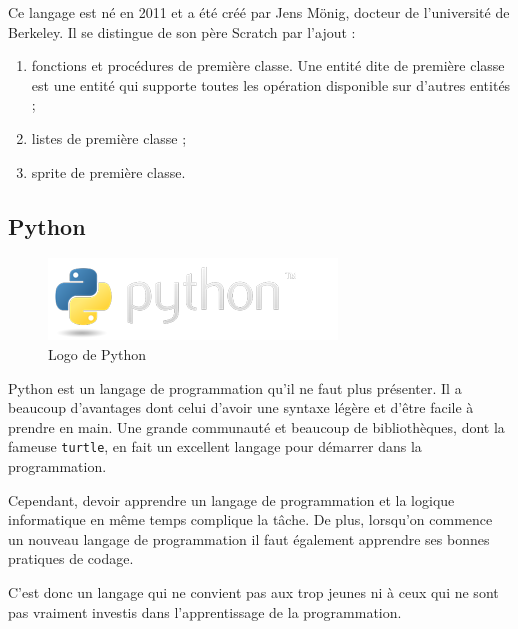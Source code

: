 Ce langage est né en 2011 et a été créé par Jens Mönig, docteur de l'université de Berkeley. Il se distingue de son père Scratch par l'ajout :
\begin{enumerate}
\item fonctions et procédures de première classe. Une entité dite de première classe est une entité qui supporte toutes les opération disponible sur d'autres entités ; %
\item listes de première classe ;
\item sprite de première classe.
\end{enumerate}

\subsection{Python}

\begin{figure}[!ht]
  \begin{center}
    \includegraphics[scale=0.4]{content/5-related_work/images/python}
    \caption{Logo de Python}
    \label{fig:python}
  \end{center}
\end{figure}

Python \cite{python} est un langage de programmation qu'il ne faut plus présenter. Il a beaucoup d'avantages dont celui d'avoir une syntaxe légère et d'être facile à prendre en main. Une grande communauté et beaucoup de bibliothèques, dont la fameuse \texttt{turtle}, en fait un excellent langage pour démarrer dans la programmation.

Cependant, devoir apprendre un langage de programmation et la logique informatique en même temps complique la tâche. De plus, lorsqu'on commence un nouveau langage de programmation il faut également apprendre ses bonnes pratiques de codage. %

C'est donc un langage qui ne convient pas aux trop jeunes ni à ceux qui ne sont pas vraiment investis dans l'apprentissage de la programmation.
